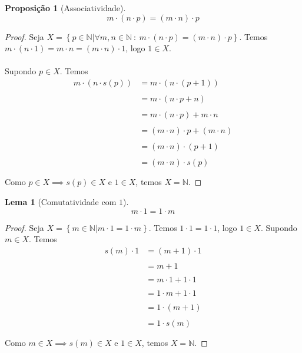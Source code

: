 \documentclass{article}
\newtheorem{prop}{Proposição}[section]
\theoremstyle{theorem}
\theoremstyle{lemma}
\newtheorem{lema}{Lema}
\theoremstyle{definition}
\theoremstyle{remark}
\begin{document}
\begin{prop}[Associatividade]
	$$m\cdot(n\cdot p) = (m\cdot n ) \cdot p$$
\end{prop}
\begin{proof}
	Seja $X = \left\{p \in \mathbb{N} | \forall m,n \in \mathbb{N} \: : \:  m\cdot( n\cdot p) = (m\cdot n )\cdot p \right\}$. Temos $m\cdot (n\cdot1) = m\cdot n = (m\cdot n ) \cdot 1$, logo $1\in X$. \\ ~\\ Supondo $p\in X$. Temos 
	 \begin{align*}
		 m\cdot (n\cdot s(p)) &= m\cdot(n\cdot ( p+1) )  \\~\\
		 &= m\cdot ( n\cdot p + n) \\~\\
		 &= m\cdot ( n\cdot p) + m\cdot n \\~\\
		 &= (m\cdot  n)\cdot p + (m\cdot n) \\~\\
		 &= (m\cdot  n)\cdot (p+1) \\~\\
		 &= (m\cdot  n)\cdot s(p) \\~\\
	\end{align*}
	Como $p\in X\implies s(p) \in X $ e $1\in X$, temos $X = \mathbb{N}$.
\end{proof}
\begin{lema}[Comutatividade com $1$]
	\label{comutatividade1}
	$$m\cdot 1 = 1 \cdot m $$
\end{lema}
\begin{proof}
	Seja $X = \left\{m \in \mathbb{N} |  m\cdot 1 = 1\cdot m  \right\}$. Temos $1\cdot 1 = 1\cdot 1  $, logo $1\in X$. Supondo $m\in X$. Temos 
	 \begin{align*}
		 s(m)\cdot 1 &= (m+1)\cdot 1   \\~\\
		 &= m+1  \\~\\
		 &= m\cdot 1 + 1\cdot1  \\~\\
		 &= 1\cdot m +1\cdot 1   \\~\\
		 &=1\cdot (m+1)   \\~\\
		 &=1\cdot s(m)   \\~\\
	\end{align*}
	Como $m\in X\implies s(m) \in X $ e $1\in X$, temos $X = \mathbb{N}$.
\end{proof}
\end{document}
